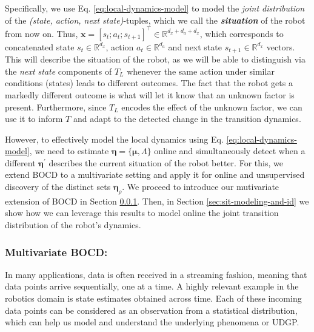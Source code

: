 \documentclass[Afour,sageh,times]{sagej}
\theoremstyle{lemma}
\begin{document}
Specifically, we use Eq. \eqref{eq:local-dynamics-model} to model the \textit{joint distribution} of the \textit{(state, action, next state)}-tuples, which we call the \textbf{\textit{situation}} of the robot from now on. Thus, $\boldsymbol{x} = [s_t; a_t; s_{t+1}]^\top \in \mathbb{R}^{d_x + d_a + d_x}$, which corresponds to concatenated state $s_t \in \mathbb{R}^{d_x}$, action $a_t \in \mathbb{R}^{d_a}$ and next state $s_{t+1} \in \mathbb{R}^{d_x}$ vectors. This will describe the situation of the robot, as we will be able to distinguish via the \textit{next state} components of $T_L$ whenever the same action under similar conditions (states) leads to different outcomes. The fact that the robot gets a markedly different outcome is what will let it know that an unknown factor is present. 
Furthermore, since $T_L$ encodes the effect of the unknown factor, we can use it to inform $T$ and adapt to the detected change in the transition dynamics.

However, to effectively model the local dynamics using Eq. \eqref{eq:local-dynamics-model}, we need to estimate $\boldsymbol{\eta} = \{\boldsymbol{\mu}, \Lambda\}$ online and simultaneously detect when a different $\boldsymbol{\eta}^\prime$ describes the current situation of the robot better. For this, we extend BOCD to a multivariate setting and apply it for online and unsupervised discovery of the distinct sets $\boldsymbol{\eta}_{\rho}$. We proceed to introduce our mutivariate extension of BOCD in Section \ref{sec:multivariate-bocd}. Then, in Section \ref{sec:sit-modeling-and-id} we show how we can leverage this results to model online the joint transition distribution of the robot's dynamics.

\subsubsection{Multivariate BOCD:} \label{sec:multivariate-bocd}

In many applications, data is often received in a streaming fashion, meaning that data points arrive sequentially, one at a time. A highly relevant example in the robotics domain is state estimates obtained across time. Each of these incoming data points can be considered as an observation from a statistical distribution, which can help us model and understand the underlying phenomena or UDGP.
\end{document}
